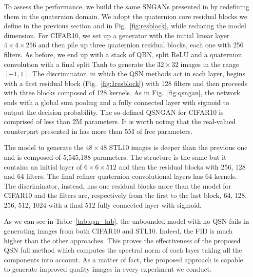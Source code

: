 \documentclass[graybox]{svmult}
\begin{document}
To assess the performance, we build the same SNGANs presented in \cite{Miyato2018SpectralNF} by redefining them in the quaternion domain. We adopt the quaternion core residual blocks we define in the previous section and in Fig.~\ref{fig:resblock}, while reducing the model dimension. For CIFAR10, we set up a generator with the initial linear layer $4 \times 4 \times 256$ and then pile up three quaternion residual blocks, each one with 256 filters. As before, we end up with a stack of QBN, split ReLU and a quaternion convolution with a final split Tanh to generate the $32 \times 32$ images in the range $[-1, 1]$. The discriminator, in which the QSN methods act in each layer, begins with a first residual block (Fig.~\ref{fig:1resblock}) with 128 filters and then proceeds with three blocks composed of 128 kernels. As in Fig.~\ref{fig:qsngan}, the network ends with a global sum pooling and a fully connected layer with sigmoid to output the decision probability. The so-defined QSNGAN for CIFAR10 is comprised of less than 2M parameters. It is worth noting that the real-valued counterpart presented in \cite{Miyato2018SpectralNF} has more than 5M of free parameters.

The model to generate the $48 \times 48$ STL10 images is deeper than the previous one and is composed of 5,545,188 parameters. The structure is the same but it contains an initial layer of $6 \times 6 \times 512$ and then the residual blocks with 256, 128 and 64 filters. The final refiner quaternion convolutional layers has 64 kernels. The discriminator, instead, has one residual blocks more than the model for CIFAR10 and the filters are, respectively from the first to the last block, 64, 128, 256, 512, 1024 with a final 512 fully connected layer with sigmoid.

As we can see in Table~\ref{tab:qsn_tab}, the unbounded model with no QSN fails in generating images from both CIFAR10 and STL10. Indeed, the FID is much higher than the other approaches. This proves the effectiveness of the proposed QSN full method which computes the spectral norm of each layer taking all the components into account. As a matter of fact, the proposed approach is capable to generate improved quality images in every experiment we conduct.
\end{document}
